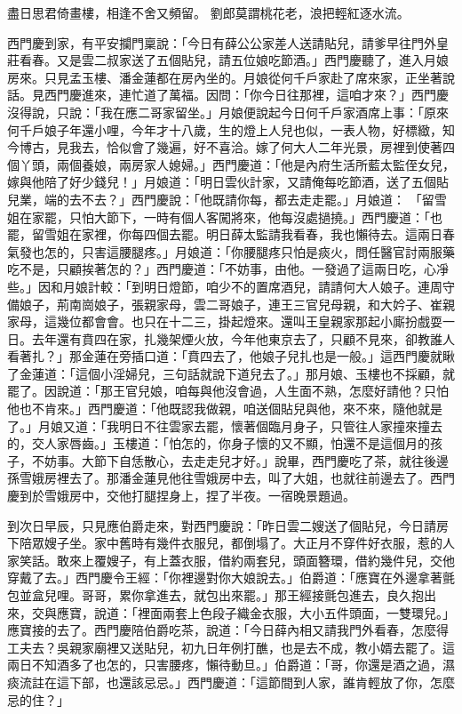 盡日思君倚畫樓，相逢不舍又頻留。
劉郎莫謂桃花老，浪把輕紅逐水流。

西門慶到家，有平安攔門稟說：「今日有薛公公家差人送請貼兒，請爹早往門外皇莊看春。又是雲二叔家送了五個貼兒，請五位娘吃節酒。」西門慶聽了，進入月娘房來。只見孟玉樓、潘金蓮都在房內坐的。月娘從何千戶家赴了席來家，正坐著說話。見西門慶進來，連忙道了萬福。因問：「你今日往那裡，這咱才來？」西門慶沒得說，只說：「我在應二哥家留坐。」月娘便說起今日何千戶家酒席上事：「原來何千戶娘子年還小哩，今年才十八歲，生的燈上人兒也似，一表人物，好標緻，知今博古，見我去，恰似會了幾遍，好不喜洽。嫁了何大人二年光景，房裡到使著四個丫頭，兩個養娘，兩房家人媳婦。」西門慶道：「他是內府生活所藍太監侄女兒，嫁與他陪了好少錢兒！」月娘道：「明日雲伙計家，又請俺每吃節酒，送了五個貼兒業，端的去不去？」西門慶說：「他既請你每，都去走走罷。」月娘道： 「留雪姐在家罷，只怕大節下，一時有個人客闖將來，他每沒處撾撓。」西門慶道：「也罷，留雪姐在家裡，你每四個去罷。明日薛太監請我看春，我也懶待去。這兩日春氣發也怎的，只害這腰腿疼。」月娘道：「你腰腿疼只怕是痰火，問任醫官討兩服藥吃不是，只顧挨著怎的？」西門慶道：「不妨事，由他。一發過了這兩日吃，心凈些。」因和月娘計較：「到明日燈節，咱少不的置席酒兒，請請何大人娘子。連周守備娘子，荊南崗娘子，張親家母，雲二哥娘子，連王三官兒母親，和大妗子、崔親家母，這幾位都會會。也只在十二三，掛起燈來。還叫王皇親家那起小廝扮戲耍一日。去年還有賁四在家，扎幾架煙火放，今年他東京去了，只顧不見來，卻教誰人看著扎？」那金蓮在旁插口道：「賁四去了，他娘子兒扎也是一般。」這西門慶就瞅了金蓮道：「這個小淫婦兒，三句話就說下道兒去了。」那月娘、玉樓也不採顧，就罷了。因說道：「那王官兒娘，咱每與他沒會過，人生面不熟，怎麼好請他？只怕他也不肯來。」西門慶道：「他既認我做親，咱送個貼兒與他，來不來，隨他就是了。」月娘又道：「我明日不往雲家去罷，懷著個臨月身子，只管往人家撞來撞去的，交人家唇齒。」玉樓道：「怕怎的，你身子懷的又不顯，怕還不是這個月的孩子，不妨事。大節下自恁散心，去走走兒才好。」說畢，西門慶吃了茶，就往後邊孫雪娥房裡去了。那潘金蓮見他往雪娥房中去，叫了大姐，也就往前邊去了。西門慶到於雪娥房中，交他打腿捏身上，捏了半夜。一宿晚景題過。

到次日早辰，只見應伯爵走來，對西門慶說：「昨日雲二嫂送了個貼兒，今日請房下陪眾嫂子坐。家中舊時有幾件衣服兒，都倒塌了。大正月不穿件好衣服，惹的人家笑話。敢來上覆嫂子，有上蓋衣服，借約兩套兒，頭面簪環，借約幾件兒，交他穿戴了去。」西門慶令王經：「你裡邊對你大娘說去。」伯爵道：「應寶在外邊拿著氈包並盒兒哩。哥哥，累你拿進去，就包出來罷。」那王經接氈包進去，良久抱出來，交與應寶，說道：「裡面兩套上色段子織金衣服，大小五件頭面，一雙環兒。」應寶接的去了。西門慶陪伯爵吃茶，說道：「今日薛內相又請我門外看春，怎麼得工夫去？吳親家廟裡又送貼兒，初九日年例打醮，也是去不成，教小婿去罷了。這兩日不知酒多了也怎的，只害腰疼，懶待動旦。」伯爵道：「哥，你還是酒之過，濕痰流註在這下部，也還該忌忌。」西門慶道：「這節間到人家，誰肯輕放了你，怎麼忌的住？」

